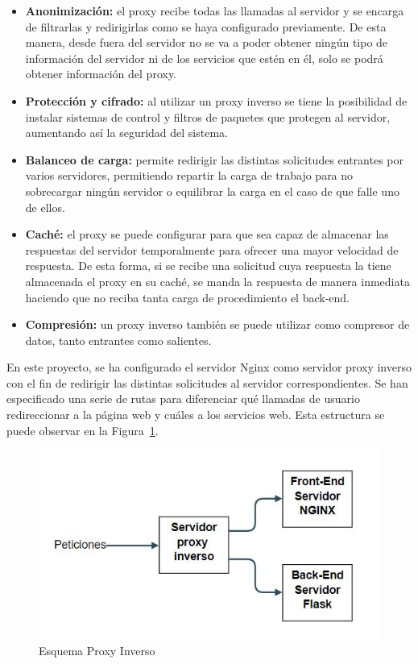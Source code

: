 \begin{itemize}
	
	\item \textbf{Anonimización:} el proxy recibe todas las llamadas al servidor y se encarga de filtrarlas y redirigirlas como se haya configurado previamente. De esta manera, desde fuera del servidor no se va a poder obtener ningún tipo de información del servidor ni de los servicios que estén en él, solo se podrá obtener información del proxy.
	
	\item \textbf{Protección y cifrado:} al utilizar un proxy inverso se tiene la posibilidad de instalar sistemas de control y filtros de paquetes que protegen al servidor, aumentando así la seguridad del sistema.
	
	\item \textbf{Balanceo de carga:} permite redirigir las distintas solicitudes entrantes por varios servidores, permitiendo repartir la carga de trabajo para no sobrecargar ningún servidor o equilibrar la carga en el caso de que falle uno de ellos.
	
	\item \textbf{Caché:} el proxy se puede configurar para que sea capaz de almacenar las respuestas del servidor temporalmente para ofrecer una mayor velocidad de respuesta. De esta forma, si se recibe una solicitud cuya respuesta la tiene almacenada el proxy en su caché, se manda la respuesta de manera inmediata haciendo que no reciba tanta carga de procedimiento el back-end.
	
	\item \textbf{Compresión:} un proxy inverso también se puede utilizar como compresor de datos, tanto entrantes como salientes.
	
\end{itemize}

En este proyecto, se ha configurado el servidor Nginx como servidor proxy inverso con el fin de redirigir las distintas solicitudes al servidor correspondientes. Se han especificado una serie de rutas para diferenciar qué llamadas de usuario redireccionar a la página web y cuáles a los servicios web. Esta estructura se puede observar en la Figura~\ref {fig: imgProxy}.

\begin{figure}[]
	\centering
	
	\includegraphics[width=1\textwidth]{Imagenes/Fuentes/Text2LSE/proxy.jpg}
	\caption{Esquema Proxy Inverso}
	\label {fig: imgProxy}
\end{figure}

